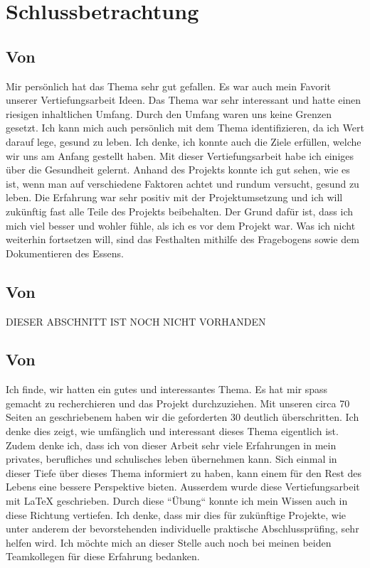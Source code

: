 \chapter{Schlussbetrachtung}
\section{Von \bastian}
\authortoc{\bastian}{\sectionident}
Mir persönlich hat das Thema sehr gut gefallen. Es war auch mein Favorit unserer Vertiefungsarbeit Ideen. Das Thema war sehr interessant und hatte einen riesigen inhaltlichen Umfang. Durch den Umfang waren uns keine Grenzen gesetzt. Ich kann mich auch persönlich mit dem Thema identifizieren, da ich Wert darauf lege, gesund zu leben. Ich denke, ich konnte auch die Ziele erfüllen, welche wir uns am Anfang gestellt haben. Mit dieser Vertiefungsarbeit habe ich einiges über die Gesundheit gelernt. Anhand des Projekts konnte ich gut sehen, wie es ist, wenn man auf verschiedene Faktoren achtet und rundum versucht, gesund zu leben. Die Erfahrung war sehr positiv mit der Projektumsetzung und ich will zukünftig fast alle Teile des Projekts beibehalten. Der Grund dafür ist, dass ich mich viel besser und wohler fühle, als ich es vor dem Projekt war. Was ich nicht weiterhin fortsetzen will, sind das Festhalten mithilfe des Fragebogens sowie dem Dokumentieren des Essens. 
\section{Von \dario}
\authortoc{\dario}{\sectionident}
DIESER ABSCHNITT IST NOCH NICHT VORHANDEN
\newline
\newline
\lipsum[4-8][32-64]
\section{Von \jonas}
\authortoc{\jonas}{\sectionident}
Ich finde, wir hatten ein gutes und interessantes Thema. Es hat mir spass gemacht zu recherchieren und das Projekt durchzuziehen. Mit unseren circa 70 Seiten an geschriebenem haben wir die geforderten 30 deutlich überschritten. Ich denke dies zeigt, wie umfänglich und interessant dieses Thema eigentlich ist.
\newline
\newline
Zudem denke ich, dass ich von dieser Arbeit sehr viele Erfahrungen in mein privates, berufliches und schulisches leben übernehmen kann. Sich einmal in dieser Tiefe über dieses Thema informiert zu haben, kann einem für den Rest des Lebens eine bessere Perspektive bieten. Ausserdem wurde diese Vertiefungsarbeit mit LaTeX geschrieben. Durch diese “Übung“ konnte ich mein Wissen auch in diese Richtung vertiefen. Ich denke, dass mir dies für zukünftige Projekte, wie unter anderem der bevorstehenden individuelle praktische Abschlussprüfing, sehr helfen wird.
\newline
\newline
Ich möchte mich an dieser Stelle auch noch bei meinen beiden Teamkollegen für diese Erfahrung bedanken.